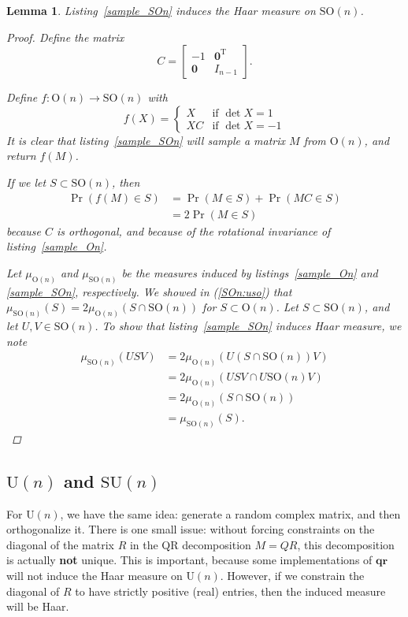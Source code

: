 \documentclass[letterpaper,11pt]{article}
\newtheorem{lemma}{Lemma}
\newcommand{\Tr}{^\text{T}}
\newcommand{\zeros}{\mathbf{0}}
\newcommand{\MG}[2]{{\text{#1}(#2)}}
\newcommand{\Un}{\MG{U}{n}}
\newcommand{\On}{\MG{O}{n}}
\newcommand{\SUn}{\MG{SU}{n}}
\newcommand{\SOn}{\MG{SO}{n}}
\newcommand{\qr}{\mathbf{qr}}
\begin{document}
\begin{lemma}
Listing~\ref{sample_SOn} induces the Haar measure on $\SOn$.

\begin{proof}
Define the matrix
\[
  C = \begin{bmatrix}-1 & \zeros\Tr\\ \zeros & I_{n-1} \end{bmatrix}.
\]

Define $f:\On\to\SOn$ with
\[
  f(X) = \left\{
\begin{array}{ll}
  X & \mbox{if }\det{X} = 1\\
 XC & \mbox{if }\det{X} = -1
\end{array}\right.
\]
It is clear that listing~\ref{sample_SOn} will sample a matrix $M$ from $\On$,
  and return $f(M)$.

If we let $S \subset \SOn$, then
\begin{align}\label{SOn:uso}
  \Pr\left(f(M) \in S\right)
  &=\Pr\left(M \in S \right) + \Pr\left( MC \in S \right) \\
  &=2\Pr\left(M \in S \right)
\end{align}
because $C$ is orthogonal, and because of the rotational invariance of
  listing~\ref{sample_On}.

Let $\mu_\On$ and $\mu_\SOn$ be the measures induced by
  listings~\ref{sample_On} and \ref{sample_SOn}, respectively.
We showed in (\ref{SOn:uso}) that $\mu_\SOn(S) = 2\mu_\On(S\cap \SOn)$ for
  $S\subset\On$.
Let $S \subset \SOn$, and let $U,V \in \SOn$.
To show that listing~\ref{sample_SOn} induces Haar measure, we note
\begin{align}
  \mu_\SOn(USV) &= 2 \mu_\On(U(S\cap\SOn)V)\\
  &= 2 \mu_\On(USV \cap U\SOn V)\\
  &= 2 \mu_\On(S \cap \SOn)\\
  &= \mu_\SOn(S).
\end{align}
\end{proof}
\end{lemma}

\subsection{$\Un$ and $\SUn$}

For $\Un$, we have the same idea: generate a random complex matrix, and then
  orthogonalize it.
There is one small issue: without forcing constraints on the diagonal of the
  matrix $R$ in the QR decomposition $M=QR$, this decomposition is actually
  {\bf not} unique.
This is important, because some implementations of $\qr$ will not induce
  the Haar measure on $\Un$.
However, if we constrain the diagonal of $R$ to have strictly positive (real)
  entries, then the induced measure will be Haar.
\end{document}
